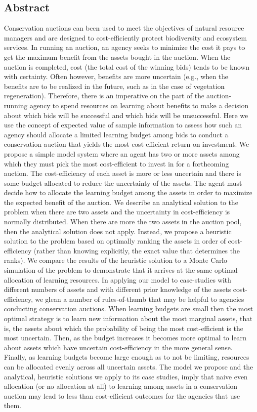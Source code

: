 
\subsection*{Abstract}\label{abstract}

Conservation auctions can been used to meet the objectives of natural resource managers and are designed to cost-efficiently protect biodiversity and ecosystem services. In running an auction, an agency seeks to minimize the cost it pays to get the maximum benefit from the assets bought in the auction. When the auction is completed, cost (the total cost of the winning bids) tends to be known with certainty. Often however, benefits are more uncertain (e.g., when the benefits are to be realized in the future, such as in the case of vegetation regeneration). Therefore, there is an imperative on the part of the auction-running agency to spend resources on learning about benefits  to make a decision about which bids will be successful and which bids will be unsuccessful. Here we use the concept of expected value of sample information to assess how such an agency should allocate a limited learning budget among bids to conduct a conservation auction that yields the most cost-efficient return on investment. We propose a simple model system where an agent has two or more assets among which they must pick the most cost-efficient to invest in for a forthcoming auction. The cost-efficiency of each asset is more or less uncertain and there is some budget allocated to reduce the uncertainty of the assets. The agent must decide how to allocate the learning budget among the assets in order to maximize the expected benefit of the auction. We describe an analytical solution to the problem when there are two assets and the uncertainty in cost-efficiency is normally distributed. When there are more the two assets in the auction pool, then the analytical solution does not apply. Instead, we propose a heuristic solution to the problem based on optimally ranking the assets in order of cost-efficiency (rather than knowing explicitly, the exact value that determines the ranks). We compare the results of the heuristic solution to a Monte Carlo simulation of the problem to demonstrate that it arrives at the same optimal allocation of learning resources. In applying our model to case-studies with different numbers of assets and with different prior knowledge of the assets cost-efficiency, we glean a number of rules-of-thumb that may be helpful to agencies conducting conservation auctions. When learning budgets are small then the most optimal strategy is to learn new information about the most marginal assets, that is, the assets about which the probability of being the most cost-efficient is the most uncertain. Then, as the budget increases it becomes more optimal to learn about assets which have uncertain cost-efficiency in the more general sense. Finally, as learning budgets become large enough as to not be limiting, resources can be allocated evenly across all uncertain assets. The model we propose and the analytical, heuristic solutions we apply to its case studies, imply that naive even allocation (or no allocation at all) to learning among assets in a conservation auction may lead to less than cost-efficient outcomes for the agencies that use them.
